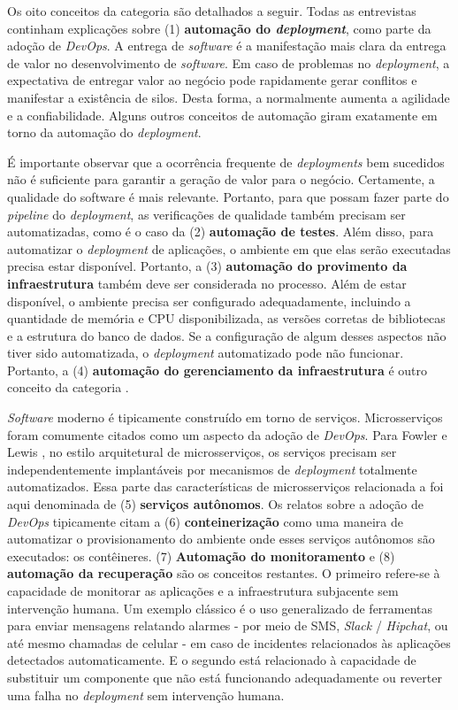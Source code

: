 Os oito conceitos da categoria  são detalhados a seguir.
Todas as entrevistas continham explicações sobre (1) {\bf automação do \emph{deployment}},
como parte da adoção de {\it DevOps}. A entrega de {\it software} é a
manifestação mais clara da entrega de valor no desenvolvimento de {\it software}.
Em caso de problemas no {\it deployment}, a expectativa de entregar valor ao
negócio pode rapidamente gerar conflitos e manifestar a existência de silos.
Desta forma, a  normalmente aumenta a agilidade e a confiabilidade.
Alguns outros conceitos de automação giram exatamente em torno da automação do
{\it deployment}.

É importante observar que a ocorrência frequente de {\it deployments} bem
sucedidos não é suficiente para garantir a geração de valor para o negócio.
Certamente, a qualidade do software é mais relevante. Portanto, para que possam
fazer parte do {\it pipeline} do {\it deployment}, as verificações de qualidade
também precisam ser automatizadas, como é o caso da (2) {\bf automação de testes}.
Além disso, para automatizar o {\it deployment} de aplicações, o ambiente em
que elas serão executadas precisa estar disponível. Portanto, a (3) {\bf automação
do provimento da infraestrutura} também deve ser considerada no processo. Além
de estar disponível, o ambiente precisa ser configurado adequadamente,
incluindo a quantidade de memória e CPU disponibilizada, as versões corretas de
bibliotecas  e a estrutura do banco de dados. Se a configuração de algum
desses aspectos não tiver sido automatizada, o {\it deployment} automatizado
pode não funcionar. Portanto, a (4) {\bf automação do gerenciamento da
infraestrutura} é outro conceito da categoria .

{\it Software} moderno é tipicamente construído em torno de serviços.
Microsserviços foram comumente citados como um aspecto da adoção de {\it DevOps}.
Para Fowler e Lewis \cite{martinfowler2014microservices}, no estilo arquitetural
de microsserviços, os serviços precisam ser independentemente implantáveis por
mecanismos de {\it deployment} totalmente automatizados. Essa parte das
características de microsserviços relacionada a  foi aqui
denominada de (5) {\bf serviços autônomos}. Os relatos sobre a adoção de {\it DevOps}
tipicamente citam a (6) {\bf conteinerização} como uma maneira de automatizar o
provisionamento do ambiente onde esses serviços autônomos são executados: os
contêineres. (7) {\bf Automação do monitoramento} e (8) {\bf automação da
recuperação} são os conceitos restantes. O primeiro refere-se à capacidade de
monitorar as aplicações e a infraestrutura subjacente sem intervenção humana.
Um exemplo clássico é o uso generalizado de ferramentas para enviar mensagens
relatando alarmes - por meio de SMS, {\it Slack} / {\it Hipchat}, ou até mesmo
chamadas de celular - em caso de incidentes relacionados às aplicações
detectados automaticamente. E o segundo está relacionado à capacidade de
substituir um componente que não está funcionando adequadamente ou reverter uma
falha no {\it deployment} sem intervenção humana.

